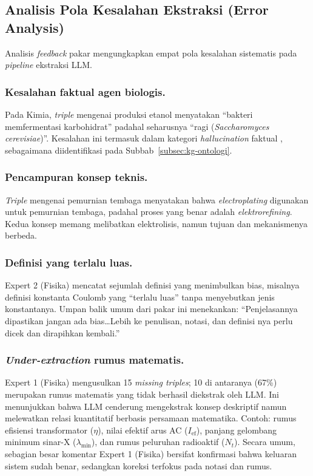 \documentclass[main]{subfiles}
\begin{document}
\subsection{Analisis Pola Kesalahan Ekstraksi (Error Analysis)}\label{subsubsec:error-analysis}

Analisis \textit{feedback} pakar mengungkapkan empat pola kesalahan sistematis
pada \textit{pipeline} ekstraksi LLM.

\subsubsection{Kesalahan faktual agen biologis.} Pada Kimia, \textit{triple} mengenai produksi
etanol menyatakan ``bakteri memfermentasi karbohidrat'' padahal seharusnya
``ragi (\textit{Saccharomyces cerevisiae})''. Kesalahan ini termasuk dalam kategori
\textit{hallucination} faktual \parencite{ji_survey_2023, min_factscore_2023}, sebagaimana
diidentifikasi pada Subbab~\ref{subsec:kg-ontologi}.

\subsubsection{Pencampuran konsep teknis.} \textit{Triple} mengenai pemurnian tembaga menyatakan
bahwa \textit{electroplating} digunakan untuk pemurnian tembaga, padahal proses yang
benar adalah \textit{elektrorefining}. Kedua konsep memang melibatkan elektrolisis,
namun tujuan dan mekanismenya berbeda.

\subsubsection{Definisi yang terlalu luas.} Expert 2 (Fisika) mencatat sejumlah definisi yang
menimbulkan bias, misalnya definisi konstanta Coulomb yang ``terlalu luas'' tanpa
menyebutkan jenis konstantanya. Umpan balik umum dari pakar ini menekankan:
``Penjelasannya dipastikan jangan ada bias\ldots Lebih ke penulisan, notasi, dan
definisi nya perlu dicek dan dirapihkan kembali.''

\subsubsection{\textit{Under-extraction} rumus matematis.} Expert 1 (Fisika) mengusulkan
15 \textit{missing triples}; 10 di antaranya (67\%) merupakan rumus matematis
yang tidak berhasil diekstrak oleh LLM. Ini menunjukkan bahwa LLM cenderung
mengekstrak konsep deskriptif namun melewatkan relasi kuantitatif berbasis
persamaan matematika. Contoh: rumus efisiensi transformator ($\eta$), nilai
efektif arus AC ($I_\text{ef}$), panjang gelombang minimum sinar-X
($\lambda_\text{min}$), dan rumus peluruhan radioaktif ($N_t$). Secara umum,
sebagian besar komentar Expert 1 (Fisika) bersifat konfirmasi bahwa keluaran
sistem sudah benar, sedangkan koreksi terfokus pada notasi dan rumus.
\end{document}
